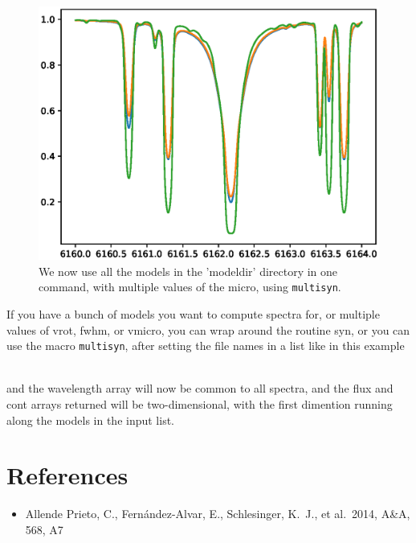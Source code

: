 \documentclass[]{article}
\begin{document}
\begin{figure}[t!]
\centering
\includegraphics[width=14cm]{Figure_5.ps}
\caption{We now use all the models in the 'modeldir' directory in one command, with multiple values of the micro, using {\tt multisyn}.
\label{rotin}
}
\end{figure}


If you have a bunch of models you want to compute spectra for, or multiple values of vrot, fwhm, or vmicro, you can wrap around the routine syn, or you can use the macro {\tt multisyn}, after setting the file names in a list like  in this example


\\

\noindent and the wavelength array will now be common to all spectra, and the flux and cont arrays returned will be two-dimensional, with the first dimention running along the models in the input list.

\section{References}

\begin{itemize}
\item Allende Prieto, C., Fern{\'a}ndez-Alvar, E., Schlesinger, K.~J., et al.\ 2014, A\&A, 568, A7 
\end{itemize}
\end{document}
